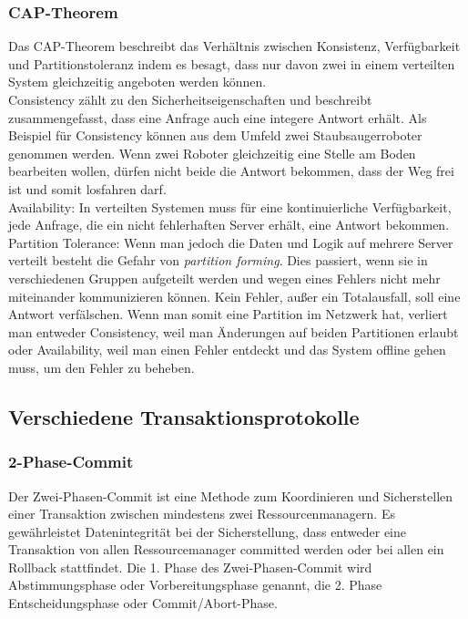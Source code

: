 \documentclass[letterpaper, 12pt]{article}
\let\tempsubsection\subsection
\renewcommand\subsection[1]{\vspace{0cm}\tempsubsection{#1}\vspace{0cm}}
\let\tempsubsubsection\subsubsection
\renewcommand\subsubsection[1]{\vspace{0cm}\tempsubsubsection{#1}\vspace{0cm}}
\begin{document}
\subsubsection{CAP-Theorem}

Das CAP-Theorem beschreibt das Verhältnis zwischen Konsistenz, Verfügbarkeit und Partitionstoleranz indem es besagt, dass nur davon zwei in
einem verteilten System gleichzeitig angeboten werden können. \\
Consistency zählt zu den Sicherheitseigenschaften und beschreibt zusammengefasst, dass eine Anfrage auch eine integere Antwort erhält. Als Beispiel für Consistency können aus dem Umfeld zwei Staubsaugerroboter genommen werden. Wenn zwei Roboter
gleichzeitig eine Stelle am Boden bearbeiten wollen, dürfen nicht beide die Antwort bekommen, dass der Weg frei ist und somit losfahren darf. \\
Availability: In verteilten Systemen muss für eine kontinuierliche Verfügbarkeit, jede Anfrage, die ein nicht fehlerhaften Server erhält, eine Antwort bekommen. \\
Partition Tolerance: Wenn man jedoch die Daten und Logik auf mehrere
Server verteilt besteht die Gefahr von \textit{partition forming}. Dies passiert, wenn sie in verschiedenen
Gruppen aufgeteilt werden und wegen eines Fehlers nicht
mehr miteinander kommunizieren können. Kein Fehler, außer ein Totalausfall, soll eine Antwort
verfälschen. Wenn man somit eine Partition im Netzwerk hat, verliert man entweder Consistency,
weil man Änderungen auf beiden Partitionen erlaubt oder Availability, weil man einen
Fehler entdeckt und das System offline gehen muss, um den Fehler zu beheben. \cite{ausarbeitungtra}

\subsection{Verschiedene Transaktionsprotokolle}

\subsubsection{2-Phase-Commit}

Der Zwei-Phasen-Commit ist eine Methode zum Koordinieren und Sicherstellen einer Transaktion zwischen mindestens
zwei Ressourcenmanagern. Es gewährleistet Datenintegrität bei der Sicherstellung, dass entweder
eine Transaktion von allen Ressourcemanager committed werden oder bei allen ein Rollback
stattfindet. Die 1. Phase des Zwei-Phasen-Commit wird Abstimmungsphase oder Vorbereitungsphase
genannt, die 2. Phase Entscheidungsphase oder Commit/Abort-Phase. \cite{ausarbeitungtra}
\end{document}
